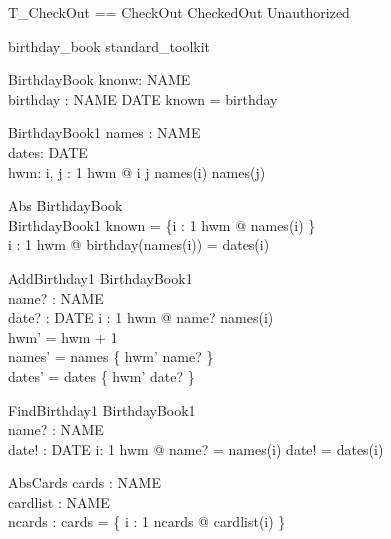 \documentclass{llncs}
\begin{document}
\begin{zed}
T\_CheckOut == CheckOut \lor CheckedOut \lor Unauthorized
\end{zed}



\begin{zsection}
\SECTION birthday\_book \parents standard\_toolkit
\end{zsection}

\begin{schema}{BirthdayBook}
knonw: \power NAME \\
birthday : NAME \pfun DATE
\where
known = \dom birthday
\end{schema}
\begin{schema}{BirthdayBook1}
names : \nat \fun NAME \\
dates: \nat \fun DATE \\
hwm: \nat
\where
\forall i, j : 1 \upto hwm @ i \neq j \implies names(i) \neq names(j)
\end{schema}
\begin{schema}{Abs}
BirthdayBook \\
BirthdayBook1
\where
known = \{i : 1 \upto hwm @ names(i) \} \\
\forall i : 1 \upto hwm @ birthday(names(i)) = dates(i)
\end{schema}

\begin{schema}{AddBirthday1}
\Delta BirthdayBook1 \\
name? : NAME \\
date? : DATE
\where
\forall i : 1 \upto hwm @ name? \neq names(i) \\
hwm' = hwm + 1 \\
names' = names \oplus \{ hwm' \mapsto name? \} \\
dates' = dates \oplus \{ hwm' \mapsto date? \}
\end{schema}

\begin{schema}{FindBirthday1}
\Xi BirthdayBook1 \\
name? : NAME \\
date! : DATE
\where
\exists i: 1 \upto hwm @ name? = names(i) \land date! = dates(i)
\end{schema}

\begin{schema}{AbsCards}
cards : \power NAME \\
cardlist : \nat \fun NAME \\
ncards : \nat
\where
cards = \{ i : 1 \upto ncards @ cardlist(i) \}
\end{schema}
\end{document}

